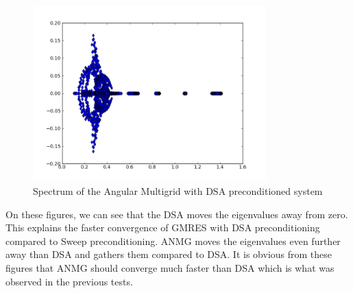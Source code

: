 \begin{figure}[H]
\centering
\includegraphics[width=9cm]{p_s8_5_5}
\caption{Spectrum of the Angular Multigrid with DSA preconditioned system}
\end{figure}

On these figures, we can see that the DSA moves the eigenvalues away from
zero. This explains the faster convergence of GMRES with DSA preconditioning
compared to Sweep preconditioning. ANMG moves the
eigenvalues even further away than DSA and gathers them compared to DSA.
It is obvious from these figures that ANMG should converge much faster than
DSA which is what was observed in the previous tests. 
